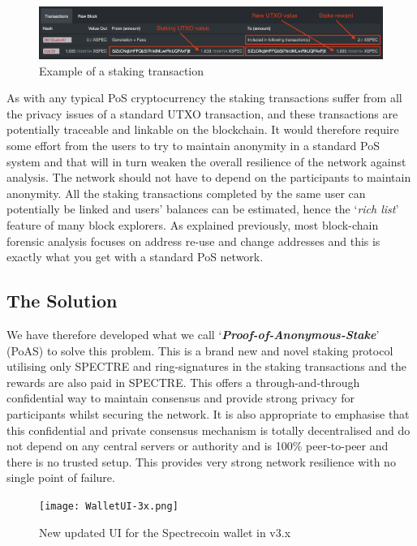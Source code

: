 \begin{figure}[h]
    \centering
    \includegraphics[width=\textwidth]{Images/txnexample.png}
    \caption{Example of a staking transaction}
    \label{fig}
\end{figure}


\noindent
As with any typical PoS cryptocurrency the staking transactions suffer
from all the privacy issues of a standard UTXO transaction, and these
transactions are potentially traceable and linkable on the blockchain.
It would therefore require some effort from the users to try to maintain
anonymity in a standard PoS system and that will in turn weaken the overall
resilience of the network against analysis. The network should not have to
depend on the participants to maintain anonymity. All the staking
transactions completed by the same user can potentially be linked and users’
balances can be estimated, hence the ‘\textit{rich list}’ feature of many
block explorers. As explained previously, most block-chain forensic analysis
focuses on address re-use and change addresses and this is exactly what you
get with a standard PoS network.



\subsection{The Solution}
We have therefore developed what we call ‘\textbf{\textit{Proof-of-Anonymous-Stake}}’
(PoAS) to solve this problem. This is a brand new and novel staking protocol
utilising only SPECTRE and ring-signatures in the staking transactions and
the rewards are also paid in SPECTRE. This offers a through-and-through
confidential way to maintain consensus and provide strong privacy for
participants whilst securing the network. It is also appropriate to emphasise
that this confidential and private consensus mechanism is totally
decentralised and do not depend on any central servers or authority and is
100\% peer-to-peer and there is no trusted setup. This provides very strong
network resilience with no single point of failure.

\begin{figure}[h]
	\centering
	\texttt{[image: WalletUI-3x.png]}
	\caption{New updated UI for the Spectrecoin wallet in v3.x}
\end{figure}



